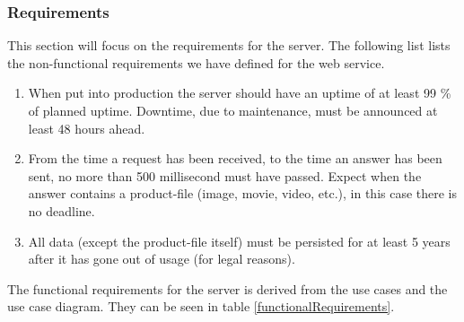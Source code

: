 \subsubsection{Requirements}
\label{s_serviceRequirements}
This section will focus on the requirements for the server. The following list lists the non-functional requirements we have defined for the web service.

\begin{enumerate}[label=NFR-\arabic*]
	\item When put into production the server should have an uptime of at least 99 \% of planned uptime. Downtime, due to maintenance, must be announced at least 48 hours ahead.
	
	\item From the time a request has been received, to the time an answer has been sent, no more than 500 millisecond must have passed. Expect when the answer contains a product-file (image, movie, video, etc.), in this case there is no deadline.
	
	\item All data (except the product-file itself) must be persisted for at least 5 years after it has gone out of usage (for legal reasons).
\end{enumerate}

The functional requirements for the server is derived from the use cases and the use case diagram. They can be seen in table \ref{functionalRequirements}.




